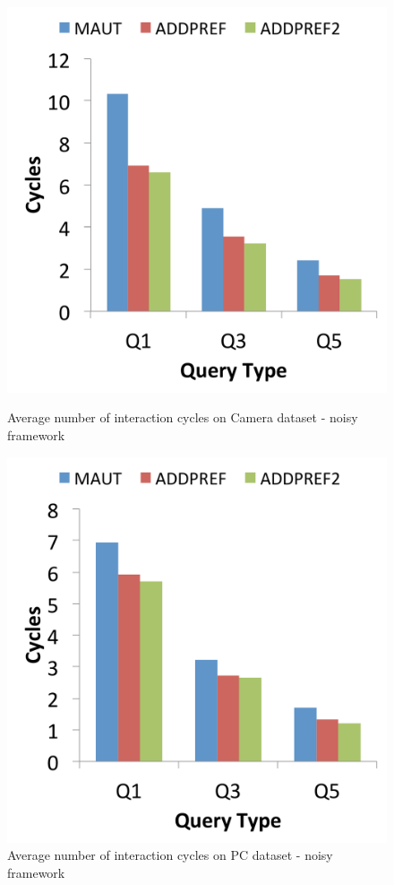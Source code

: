 \begin{figure}[h]
\centering
\begin{minipage}{.45\textwidth}
  \centering
  \includegraphics[width=1\linewidth]{figures-bharath/addPref_camera_noisy}
  \caption[]{Average number of interaction cycles on Camera dataset - noisy framework}
  \label{fig:addPref_camera_noisy}
\end{minipage}%
\;\;\;\;\;\;
\begin{minipage}{.45\textwidth}
  \centering
  \includegraphics[width=1\linewidth]{figures-bharath/addPref_pc_noisy}
  \caption[]{Average number of interaction cycles on PC dataset - noisy framework}
  \label{fig:addPref_pc_noisy}
\end{minipage}
\end{figure}

